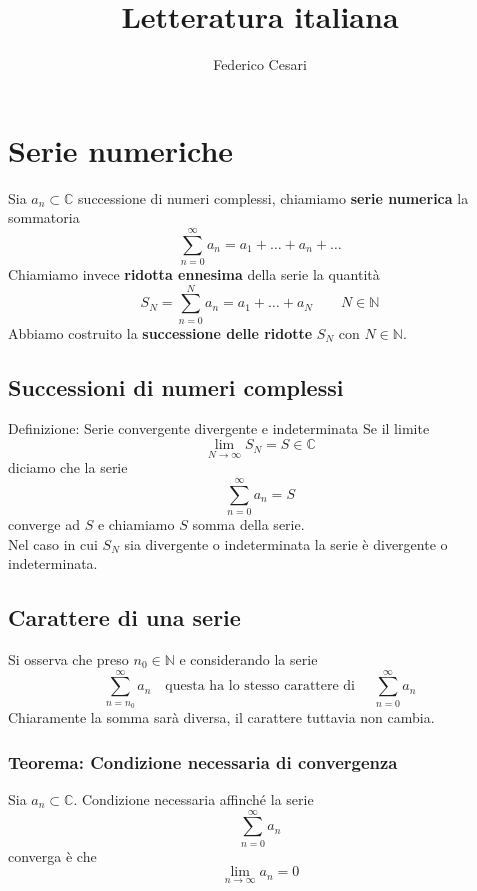 \documentclass[x11names]{article}
\title{Letteratura italiana}
\author{Federico Cesari}
\date{}
\begin{document}
	
	
	\tableofcontents
	\newpage
	
	
	\section{Serie numeriche}
	Sia \(a_{n} \subset \mathbb{C}\) successione di numeri complessi, chiamiamo \textbf{serie numerica} la sommatoria 
	\[ 
	\sum_{n=0}^{\infty} a_{n} = a_{1} + \dots + a_{n} + \dots
	\]
	Chiamiamo invece \textbf{ridotta ennesima} della serie la quantità
	\[ 
	S_{N} = \sum_{n=0}^{N} a_{n} = a_{1} + \dots + a_{N} \qquad N \in \mathbb{N}
	\]
	Abbiamo costruito la \textbf{successione delle ridotte} \(S_{N}\) con \(N\in\mathbb{N}\).
	
	\subsection{Successioni di numeri complessi}
	\begin{center}
		\colorbox{myblue}{\begin{minipage}{5.75in}
				\begin{blues}{Definizione: Serie convergente divergente e indeterminata}
					Se il limite 
					\[ 
					\lim_{N\to\infty}S_{N} = S \in \mathbb{C}
					\]
					diciamo che la serie 
					\[ 
					\sum_{n=0}^{\infty} a_{n} = S
					\]
					converge ad \(S\) e chiamiamo \(S\) somma della serie. \\
					
					Nel caso in cui \(S_{N}\) sia divergente o indeterminata la serie è divergente o indeterminata.
				\end{blues}
		\end{minipage}}       
	\end{center}
	
	
	\subsection{Carattere di una serie}
	Si osserva che preso \(n_{0} \in \mathbb{N}\) e considerando la serie
	\[ 
	\sum_{n=n_{0}}^{\infty} a_{n} \quad \text{questa ha lo stesso carattere di }\quad \sum_{n=0}^{\infty} a_{n}
	\]
	Chiaramente la somma sarà diversa, il carattere tuttavia non cambia.
	\begin{center}
		\colorbox{myred}{\begin{minipage}{5.75in}
				\begin{redes}{}
					\subsubsection{Teorema: Condizione necessaria di convergenza}
					Sia \(a_{n} \subset \mathbb{C}\). Condizione necessaria affinché la serie
					\[ 
					\sum_{n=0}^{\infty} a_{n}
					\]
					converga è che 
					\[ 
					\lim_{n\to \infty} a_{n} = 0
					\]
				\end{redes}
		\end{minipage}}        
	\end{center}
	
\end{document}
